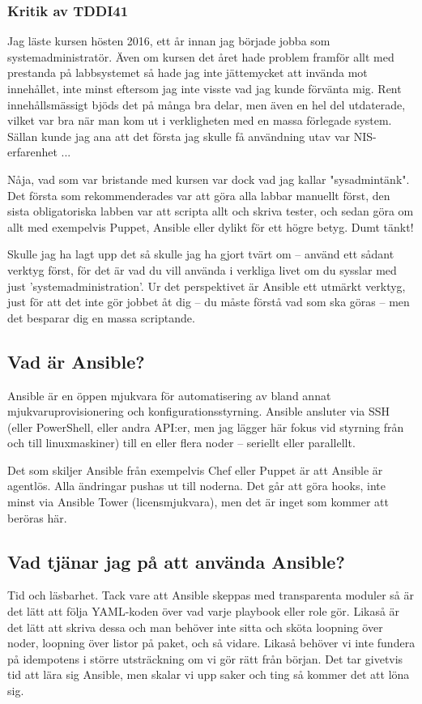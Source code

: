 \subsubsection{Kritik av TDDI41}
Jag läste kursen hösten 2016, ett år innan jag började jobba som systemadministratör.
Även om kursen det året hade problem framför allt med prestanda på labbsystemet så hade jag inte jättemycket att invända mot innehållet, inte minst eftersom jag inte visste vad jag kunde förvänta mig.
Rent innehållsmässigt bjöds det på många bra delar, men även en hel del utdaterade, vilket var bra när man kom ut i verkligheten med en massa förlegade system. Sällan kunde jag ana att det första jag 
skulle få användning utav var NIS-erfarenhet ...

Nåja, vad som var bristande med kursen var dock vad jag kallar "sysadmintänk". Det första som rekommenderades var att göra alla labbar manuellt först, den sista obligatoriska labben var att scripta allt och skriva tester,
och sedan göra om allt med exempelvis Puppet, Ansible eller dylikt för ett högre betyg. Dumt tänkt!

Skulle jag ha lagt upp det så skulle jag ha gjort tvärt om -- använd ett sådant verktyg först, för det är vad du vill använda i verkliga livet om du sysslar med just 'systemadministration'.
Ur det perspektivet är Ansible ett utmärkt verktyg, just för att det inte gör jobbet åt dig -- du måste förstå vad som ska göras -- men det besparar dig en massa scriptande.

\subsection{Vad är Ansible?}
Ansible är en öppen mjukvara för automatisering av bland annat mjukvaruprovisionering och konfigurationsstyrning. Ansible ansluter via SSH (eller PowerShell, eller andra API:er, men jag lägger här fokus vid styrning från och till linuxmaskiner) till en eller flera noder -- seriellt eller parallellt.

Det som skiljer Ansible från exempelvis Chef eller Puppet är att Ansible är agentlös. Alla ändringar pushas ut till noderna. Det går att göra hooks, inte minst via Ansible Tower (licensmjukvara), men det är inget som kommer att beröras här.

\subsection{Vad tjänar jag på att använda Ansible?}
Tid och läsbarhet. Tack vare att Ansible skeppas med transparenta moduler så är det lätt att följa YAML-koden över vad varje playbook eller role gör. 
Likaså är det lätt att skriva dessa och man behöver inte sitta och sköta loopning över noder, loopning över listor på paket, och så vidare. Likaså behöver vi inte fundera på idempotens i större utsträckning om vi gör rätt från början.
Det tar givetvis tid att lära sig Ansible, men skalar vi upp saker och ting så kommer det att löna sig.

